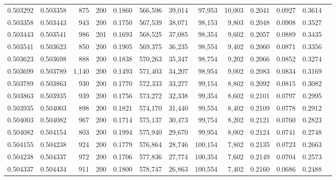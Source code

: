 \begin{tabular}{rrrrrrrrrrrrr}
0.503292 & 0.503358 &   875 & 200 &                                     0.1860 & 566,596 &  39,014 &  97,953 &  10,003 & 0.2041 & 0.0927 & 0.3614 \\
0.503358 & 0.503443 &   943 & 200 &                                     0.1750 & 567,539 &  38,071 &  98,153 &   9,803 & 0.2048 & 0.0908 & 0.3527 \\
0.503443 & 0.503541 &   986 & 201 &                                     0.1693 & 568,525 &  37,085 &  98,354 &   9,602 & 0.2057 & 0.0889 & 0.3435 \\
0.503541 & 0.503623 &   850 & 200 &                                     0.1905 & 569,375 &  36,235 &  98,554 &   9,402 & 0.2060 & 0.0871 & 0.3356 \\
0.503623 & 0.503698 &   888 & 200 &                                     0.1838 & 570,263 &  35,347 &  98,754 &   9,202 & 0.2066 & 0.0852 & 0.3274 \\
0.503699 & 0.503789 & 1,140 & 200 &                                     0.1493 & 571,403 &  34,207 &  98,954 &   9,002 & 0.2083 & 0.0834 & 0.3169 \\
0.503789 & 0.503863 &   930 & 200 &                                     0.1770 & 572,333 &  33,277 &  99,154 &   8,802 & 0.2092 & 0.0815 & 0.3082 \\
0.503863 & 0.503935 &   939 & 200 &                                     0.1756 & 573,272 &  32,338 &  99,354 &   8,602 & 0.2101 & 0.0797 & 0.2995 \\
0.503935 & 0.504003 &   898 & 200 &                                     0.1821 & 574,170 &  31,440 &  99,554 &   8,402 & 0.2109 & 0.0778 & 0.2912 \\
0.504003 & 0.504082 &   967 & 200 &                                     0.1714 & 575,137 &  30,473 &  99,754 &   8,202 & 0.2121 & 0.0760 & 0.2823 \\
0.504082 & 0.504154 &   803 & 200 &                                     0.1994 & 575,940 &  29,670 &  99,954 &   8,002 & 0.2124 & 0.0741 & 0.2748 \\
0.504155 & 0.504238 &   924 & 200 &                                     0.1779 & 576,864 &  28,746 & 100,154 &   7,802 & 0.2135 & 0.0723 & 0.2663 \\
0.504238 & 0.504337 &   972 & 200 &                                     0.1706 & 577,836 &  27,774 & 100,354 &   7,602 & 0.2149 & 0.0704 & 0.2573 \\
0.504337 & 0.504434 &   911 & 200 &                                     0.1800 & 578,747 &  26,863 & 100,554 &   7,402 & 0.2160 & 0.0686 & 0.2488 \\

\end{tabular}
